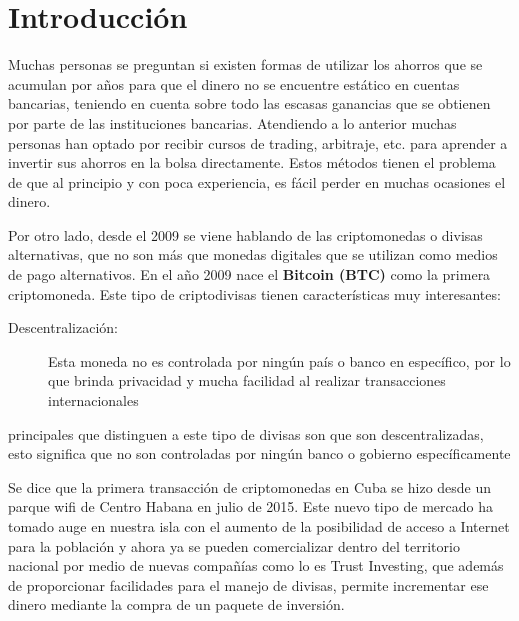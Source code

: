 \documentclass[12pt,letterpaper]{article}
\begin{document}
	
	\begin{titlepage}
		 
	\end{titlepage}


	\tableofcontents
	\thispagestyle{empty}
	\newpage
	
	\section*{Introducción}
	\setcounter{page}{1}
	
	Muchas personas se preguntan si existen formas de utilizar los ahorros que se acumulan por años para que el dinero no se encuentre estático en cuentas bancarias, teniendo en cuenta sobre todo las escasas ganancias que se obtienen por parte de las instituciones bancarias. Atendiendo a lo anterior muchas personas han optado por recibir cursos de trading, arbitraje, etc. para aprender a invertir sus ahorros en la bolsa directamente. Estos métodos tienen el problema de que al principio y con poca experiencia, es fácil perder en muchas ocasiones el dinero.
	
	Por otro lado, desde el 2009 se viene hablando de las criptomonedas o divisas alternativas, que no son más que monedas digitales que se utilizan como medios de pago alternativos. En el año 2009 nace el \textbf{Bitcoin (BTC)} como la primera criptomoneda. Este tipo de criptodivisas tienen características muy interesantes:
	
	\begin{description}
		\item[Descentralización:] Esta moneda no es controlada por ningún país o banco en específico, por lo que brinda privacidad y mucha facilidad al realizar transacciones internacionales
	\end{description}
	
	principales que distinguen a este tipo de divisas son que son descentralizadas, esto significa que no son controladas por ningún banco o gobierno específicamente

	Se dice que la primera transacción de criptomonedas en Cuba se hizo desde un parque wifi de Centro Habana en julio de 2015. Este nuevo tipo de mercado ha tomado auge en nuestra isla con el aumento de la posibilidad de acceso a Internet para la población y ahora ya se pueden comercializar dentro del territorio nacional por medio de nuevas compañías como lo es Trust Investing, que además de proporcionar facilidades para el manejo de divisas, permite incrementar ese dinero mediante la compra de un paquete de inversión.
	
\end{document}
